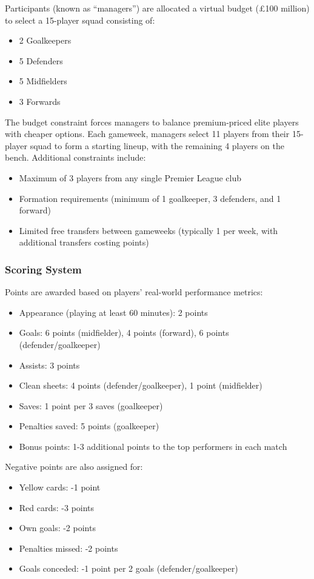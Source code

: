 Participants (known as ``managers'') are allocated a virtual budget (£100 million) to select a 15-player squad consisting of:
\begin{itemize}
    \item 2 Goalkeepers
    \item 5 Defenders
    \item 5 Midfielders
    \item 3 Forwards
\end{itemize}

The budget constraint forces managers to balance premium-priced elite players with cheaper options. Each gameweek, managers select 11 players from their 15-player squad to form a starting lineup, with the remaining 4 players on the bench. Additional constraints include:
\begin{itemize}
    \item Maximum of 3 players from any single Premier League club
    \item Formation requirements (minimum of 1 goalkeeper, 3 defenders, and 1 forward)
    \item Limited free transfers between gameweeks (typically 1 per week, with additional transfers costing points) \cite{fpl2024rules}
\end{itemize}

\subsubsection{Scoring System} \label{ch:scoring_guide}

Points are awarded based on players' real-world performance metrics:
\begin{itemize}
    \item Appearance (playing at least 60 minutes): 2 points
    \item Goals: 6 points (midfielder), 4 points (forward), 6 points (defender/goalkeeper)
    \item Assists: 3 points
    \item Clean sheets: 4 points (defender/goalkeeper), 1 point (midfielder)
    \item Saves: 1 point per 3 saves (goalkeeper)
    \item Penalties saved: 5 points (goalkeeper)
    \item Bonus points: 1-3 additional points to the top performers in each match
\end{itemize}

Negative points are also assigned for:
\begin{itemize}
    \item Yellow cards: -1 point
    \item Red cards: -3 points
    \item Own goals: -2 points
    \item Penalties missed: -2 points
    \item Goals conceded: -1 point per 2 goals (defender/goalkeeper) \cite{fpl2024rules}
\end{itemize}

